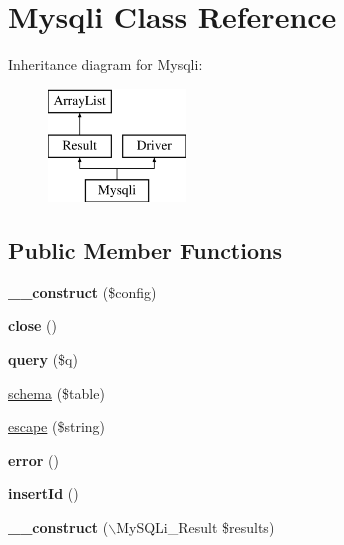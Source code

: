 \hypertarget{classMysqli}{
\section{Mysqli Class Reference}
\label{classMysqli}
}
Inheritance diagram for Mysqli:\begin{figure}[H]
\begin{center}
\leavevmode
\includegraphics[height=3.000000cm]{classMysqli}
\end{center}
\end{figure}
\subsection*{Public Member Functions}
\begin{DoxyCompactItemize}
\item 
\hypertarget{classMysqli_abe7d0ff4c4e91ac18d9896f53485a45b}{
{\bfseries \_\-\_\-construct} (\$config)}
\label{classMysqli_abe7d0ff4c4e91ac18d9896f53485a45b}

\item 
\hypertarget{classMysqli_a52e753241f689a65c52b6b998eabe436}{
{\bfseries close} ()}
\label{classMysqli_a52e753241f689a65c52b6b998eabe436}

\item 
\hypertarget{classMysqli_a0ce91225f8cfd37bd4cad459ab247e95}{
{\bfseries query} (\$q)}
\label{classMysqli_a0ce91225f8cfd37bd4cad459ab247e95}

\item 
\hyperlink{classMysqli_a74723d39c057435f85e47b9252d938c8}{schema} (\$table)
\item 
\hyperlink{classMysqli_adc7b522f15a86a7ce4893c25d250f102}{escape} (\$string)
\item 
\hypertarget{classMysqli_a0a6740bc3991ee1eff458a0b3b02fa3b}{
{\bfseries error} ()}
\label{classMysqli_a0a6740bc3991ee1eff458a0b3b02fa3b}

\item 
\hypertarget{classMysqli_aee774235ff8f047cd6f4c1921f55c10d}{
{\bfseries insertId} ()}
\label{classMysqli_aee774235ff8f047cd6f4c1921f55c10d}

\item 
\hypertarget{classMysqli_a5df969074441336368f91ae5837d8691}{
{\bfseries \_\-\_\-construct} ($\backslash$MySQLi\_\-Result \$results)}
\label{classMysqli_a5df969074441336368f91ae5837d8691}

\end{DoxyCompactItemize}
